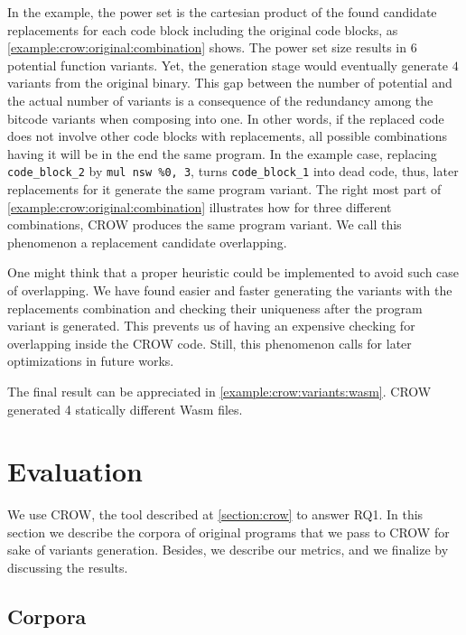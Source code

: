 In the example, the power set is the cartesian product of the found candidate replacements for each code block including the original code blocks, as \autoref{example:crow:original:combination} shows. The power set size results in $6$ potential function variants. Yet, the generation stage would eventually generate $4$ variants from the original \wasm binary. This gap between the number of potential and the actual number of variants is a consequence of the redundancy among the bitcode variants when composing into one. In other words, if the replaced code does not involve other code blocks with replacements, all possible combinations having it will be in the end the same program. In the example case, replacing \texttt{code\_block\_2} by \texttt{mul nsw \%0, 3}, turns \texttt{code\_block\_1} into dead code, thus, later replacements for it generate the same program variant. The right most part of \autoref{example:crow:original:combination} illustrates how for three different combinations, CROW produces the same program variant. We call this phenomenon a replacement candidate overlapping.

One might think that a proper heuristic could be implemented to avoid such case of overlapping. We have found easier and faster generating the variants with the replacements combination and checking their uniqueness after the program variant is generated. This prevents us of having an expensive checking for overlapping inside the CROW code. Still, this phenomenon calls for later optimizations in future works.

The final result can be appreciated in \autoref{example:crow:variants:wasm}. CROW generated 4 statically different Wasm files.




\section{Evaluation}
\label{section:crow:exp_setup}

We use CROW, the tool described at \autoref{section:crow} to answer RQ1. In this section we describe the corpora of original programs that we pass to CROW for sake of variants generation. Besides, we describe our metrics, and we finalize by discussing the results.

\subsection{Corpora}
\label{section:crow:corpora}

